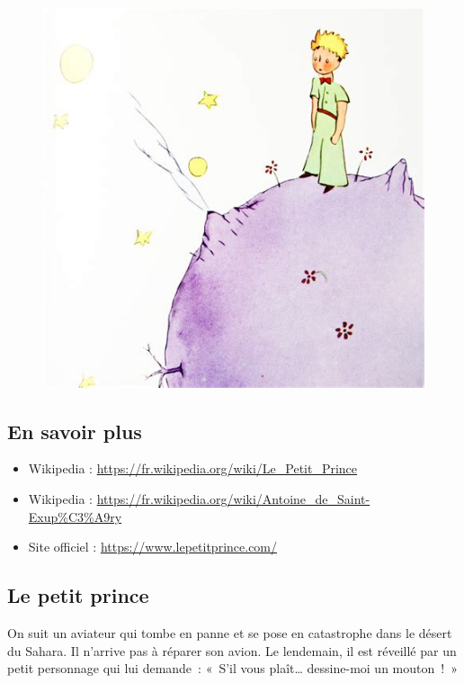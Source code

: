 \documentclass[12pt]{article}
\begin{document}
\begin{multicols}{2}

  \begin{figure}[H]
        \centering
        \includegraphics[width=0.9\linewidth]{4x5-calcul-litteral-1/sources/dm-pp.png}
  \end{figure}
\subsection*{En savoir plus}

\begin{itemize}
  \item Wikipedia : \url{https://fr.wikipedia.org/wiki/Le_Petit_Prince}
  \item Wikipedia : \url{https://fr.wikipedia.org/wiki/Antoine_de_Saint-Exup%C3%A9ry}
  \item Site officiel : \url{https://www.lepetitprince.com/}
\end{itemize}


\subsection*{Le petit prince}

On suit un aviateur qui tombe en panne et se pose en catastrophe dans le désert du Sahara. Il n’arrive pas à réparer son avion.
Le lendemain, il est réveillé par un petit personnage qui lui demande : « S'il vous plaît… dessine-moi un mouton ! » 

\end{multicols}
\newpage
\end{document}
